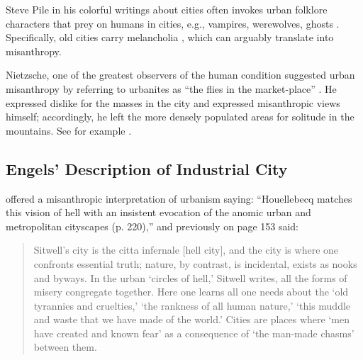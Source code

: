 \documentclass[11pt, letterpaper]{article}
\begin{document}
\begin{spacing}{1.4}
Steve Pile in his colorful writings about cities often invokes
urban folklore characters that prey on humans in cities, e.g., vampires, werewolves, ghosts  \citep{pile05,pile05B,pile99}.
%
Specifically, old cities carry melancholia \citep{pile05B}, which can arguably translate into misanthropy.
%

Nietzsche, one of the greatest observers of the human condition suggested urban
misanthropy by referring %
 to urbanites as ``the flies in the market-place'' \citep{nietzsche05}. He expressed dislike for the masses in the city and expressed misanthropic views himself; accordingly, he left the more densely populated areas for solitude in the mountains. See for example \citep{nietzsche05}.


\subsection{Engels' Description of Industrial City}   

\citet{gibson17} offered a misanthropic interpretation of urbanism saying: ``Houellebecq matches this vision of hell with an insistent evocation of the anomic urban and metropolitan cityscapes (p. 220),'' and previously on page 153 said:

\begin{quote}
  Sitwell's city is the citta infernale [hell city], and the city is where one confronts essential truth; nature, by contrast, is incidental, exists as nooks and byways. In the urban `circles of hell,' Sitwell writes, all the forms of misery congregate together.  Here one learns all one needs about the `old tyrannies and cruelties,' `the rankness of all human nature,' `this muddle and waste that we have made of the world.' Cities are places where `men have created and known fear' as a consequence of `the man-made chasms' between them.
\end{quote}


\end{spacing}
\end{document}
